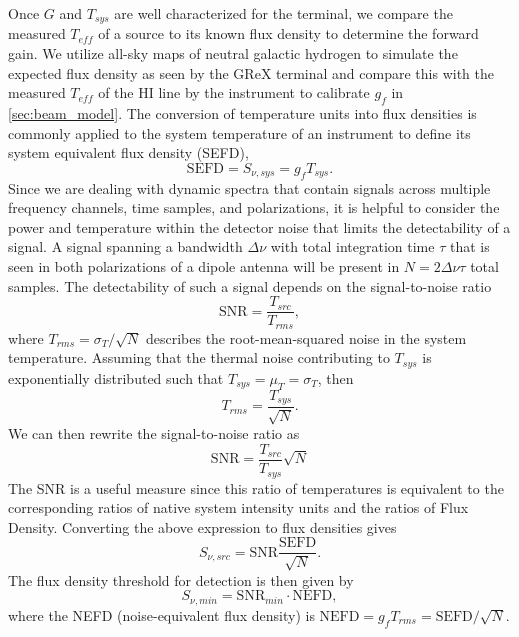 Once $G$ and $T_{sys}$ are well characterized for the terminal, we compare the measured $T_{eff}$ of a source to its known flux density to determine the forward gain. 
We utilize all-sky maps of neutral galactic hydrogen to simulate the expected flux density as seen by the GReX terminal and compare this with the measured $T_{eff}$ of the HI line by the instrument to calibrate $g_f$ in \autoref{sec:beam_model}.
The conversion of temperature units into flux densities is commonly applied to the system temperature of an instrument to define its system equivalent flux density (SEFD),
\begin{equation}
    \text{SEFD}=S_{\nu,sys}=g_fT_{sys}.\label{eq:sefd}
\end{equation}
Since we are dealing with dynamic spectra that contain signals across multiple frequency channels, time samples, and polarizations, it is helpful to consider the power and temperature within the detector noise that limits the detectability of a signal. 
A signal spanning a bandwidth $\Delta\nu$ with total integration time $\tau$ that is seen in both polarizations of a dipole antenna will be present in $N=2\Delta\nu\tau$ total samples. 
The detectability of such a signal depends on the signal-to-noise ratio
\begin{equation}
    \text{SNR}=\frac{T_{src}}{T_{rms}},
\end{equation}
where $T_{rms}=\sigma_T/\sqrt{N}$ describes the root-mean-squared noise in the system temperature. 
Assuming that the thermal noise contributing to $T_{sys}$ is exponentially distributed such that $T_{sys}=\mu_T=\sigma_T$, then 
\begin{equation*}
T_{rms}=\frac{T_{sys}}{\sqrt{N}}.
\end{equation*}
We can then rewrite the signal-to-noise ratio as
\begin{equation*}
    \text{SNR}=\frac{T_{src}}{T_{sys}}\sqrt{N}
\end{equation*}
The SNR is a useful measure since this ratio of temperatures is equivalent to the corresponding ratios of native system intensity units and the ratios of Flux Density. 
Converting the above expression to flux densities gives
\begin{equation*}
    S_{\nu,src}=\text{SNR}\frac{\text{SEFD}}{\sqrt{N}}.
\end{equation*}
The flux density threshold for detection is then given by
\begin{equation*}
    S_{\nu,min}=\text{SNR}_{min}\cdot\text{NEFD},
\end{equation*}
where the NEFD (noise-equivalent flux density) is $\text{NEFD}=g_fT_{rms}=\text{SEFD}/{\sqrt{N}}$.

